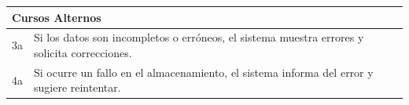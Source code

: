     \begin{table}[H]
        \begin{tabular}{llllllll}
    \hline
    \multicolumn{8}{|l|}{\cellcolor[HTML]{F2F2F2}Cursos Alternos}                                                                                                                                                                                                                                                                                \\ \hline
    \multicolumn{1}{|c|}{3a} & \multicolumn{7}{p{15cm}|}{{\color[HTML]{808080} Si los datos son incompletos o erróneos, el sistema muestra errores y solicita correcciones.}}                                                                                                                                      \\ \hline
    \multicolumn{1}{|c|}{4a} & \multicolumn{7}{p{15cm}|}{{\color[HTML]{808080} Si ocurre un fallo en el almacenamiento, el sistema informa del error y sugiere reintentar.}}                                                                                                                                      \\ \hline
    \end{tabular}
    \end{table}

